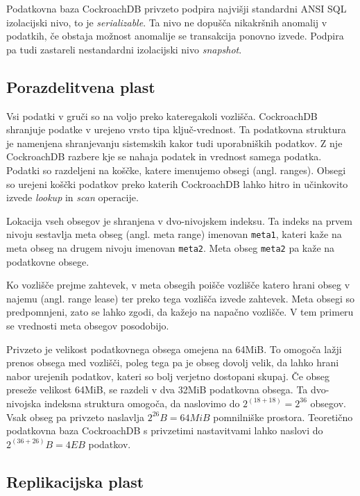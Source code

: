 \documentclass[a4paper, 12pt]{book}
\begin{document}
Podatkovna baza CockroachDB privzeto podpira najvišji standardni AN\-SI SQL izolacijski nivo, to je \textit{serializable}. Ta nivo ne dopušča nikakršnih anomalij v podatkih, če obstaja možnost anomalije se transakcija ponovno izvede. Podpira pa tudi zastareli nestandardni izolacijski nivo \textit{snapshot}.

 
\subsection{Porazdelitvena plast}

Vsi podatki v gruči so na voljo preko kateregakoli vozlišča. CockroachDB shranjuje podatke v urejeno vrsto tipa ključ-vrednost. Ta podatkovna stru\-ktu\-ra je namenjena shranjevanju sistemskih kakor tudi uporabniških podatkov. Z nje CockroachDB razbere kje se nahaja podatek in vrednost samega podatka. Podatki so razdeljeni na koščke, katere imenujemo obsegi (angl. ranges). Obsegi so urejeni koščki podatkov preko katerih CockroachDB lahko hitro in učinkovito izvede \textit{lookup} in \textit{scan} operacije.

Lokacija vseh obsegov je shranjena v dvo-nivojskem indeksu. Ta indeks na prvem nivoju sestavlja meta obseg (angl. meta range) imenovan \texttt{meta1}, kateri kaže na meta obseg na drugem nivoju imenovan \texttt{meta2}. Meta obseg \texttt{meta2} pa kaže na podatkovne obsege.

Ko vozlišče prejme zahtevek, v meta obsegih poišče vozlišče katero hrani obseg v najemu (angl. range lease) ter preko tega vozlišča izvede zahtevek. Meta obsegi so predpomnjeni, zato se lahko zgodi, da kažejo na napačno vozlišče. V tem primeru se vrednosti meta obsegov posodobijo.

Privzeto je velikost podatkovnega obsega omejena na 64MiB. To omogoča lažji prenos obsega med vozlišči, poleg tega pa je obseg dovolj velik, da lahko hrani nabor urejenih podatkov, kateri so bolj verjetno dostopani skupaj. Če obseg preseže velikost 64MiB, se razdeli v dva 32MiB podatkovna obsega. Ta dvo-nivojska indeksna struktura omogoča, da naslovimo do \(2^{(18 + 18)} = 2^{36}\) obsegov. Vsak obseg pa privzeto naslavlja \(2^{26}B = 64MiB\) pomnilniške prostora. Teoretično podatkovna baza CockroachDB s privzetimi nastavitvami lahko naslovi do \(2^{(36+26)}B = 4EB\) podatkov. 

\subsection{Replikacijska plast}
\end{document}
